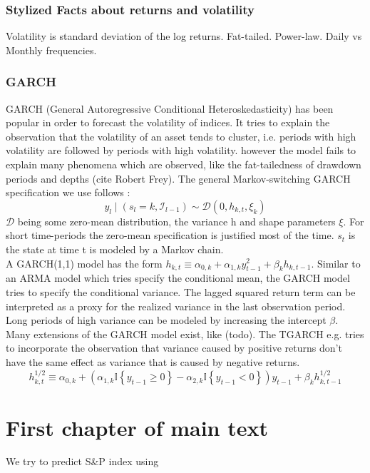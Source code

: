 \documentclass[11pt,a4paper]{article}
\begin{document}
\subsubsection{Stylized Facts about returns and volatility}
Volatility is standard deviation of the log returns.
Fat-tailed. Power-law. Daily vs Monthly frequencies. 

\subsubsection{GARCH}
GARCH (General Autoregressive Conditional Heteroskedasticity) has been popular in order to forecast the volatility of indices. It tries to explain the observation that the volatility of an asset tends to cluster, i.e. periods with high volatility are followed by periods with high volatility.
however the model fails to explain many phenomena which are observed, like the fat-tailedness of drawdown periods and depths (cite Robert Frey).
The general Markov-switching GARCH specification we use follows \cite{ardia_markov-switching_2019}: 
$$y_{l} \mid\left(s_{l}=k, \mathcal{I}_{l-1}\right) \sim \mathcal{D}\left(0, h_{k, t}, \xi_{k}\right)$$
$\mathcal{D}$ being some zero-mean distribution, the variance h and shape parameters $\xi$. For short time-periods the zero-mean specification is justified most of the time.  $s_t$ is the state at time t is modeled by a Markov chain.\\

A GARCH(1,1) model has the form $h_{k, t} \equiv \alpha_{0, k}+\alpha_{1, k} y_{t-1}^{2}+\beta_{k} h_{k, t-1}$. Similar to an ARMA model which tries specify the conditional mean, the GARCH model tries to specify the conditional variance. The lagged squared return term can be interpreted as a proxy for the realized variance in the last observation period. 
Long periods of high variance can be modeled by increasing the intercept $\beta$.\\

Many extensions of the GARCH model exist, like (todo). The TGARCH e.g. tries to incorporate the observation that variance caused by positive returns don't have the same effect as variance that is caused by negative returns.
$$h_{k, t}^{1 / 2} \equiv \alpha_{0, k}+\left(\alpha_{1, k} \mathbb{I}\left\{y_{t-1} \geq 0\right\}-\alpha_{2, k} \mathbb{I}\left\{y_{t-1}<0\right\}\right) y_{t-1}+\beta_{k} h_{k, t-1}^{1 / 2}$$

\section{First chapter of main text}
We try to predict S\&P index using 
\end{document}
